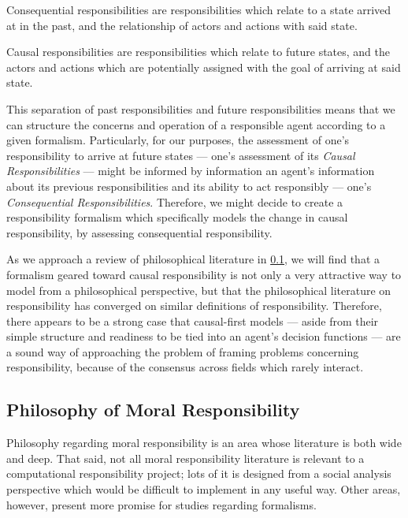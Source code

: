 \begin{displayquote}
    Consequential responsibilities are responsibilities which relate to a state arrived at in the past, and the relationship of actors and actions with said state.
\end{displayquote}\par

\begin{displayquote}
    Causal responsibilities are responsibilities which relate to future states, and the actors and actions which are potentially assigned with the goal of arriving at said state.
\end{displayquote}

This separation of past responsibilities and future responsibilities means that we can structure the concerns and operation of a responsible agent according to a given formalism. Particularly, for our purposes, the assessment of one's responsibility to arrive at future states --- one's assessment of its \emph{Causal Responsibilities} --- might be informed by information an agent's information about its previous responsibilities and its ability to act responsibly --- one's \emph{Consequential Responsibilities}. Therefore, we might decide to create a responsibility formalism which specifically models the change in causal responsibility, by assessing consequential responsibility.\par

As we approach a review of philosophical literature in \cref{subsec:philosophy}, we will find that a formalism geared toward causal responsibility is not only a very attractive way to model from a philosophical perspective, but that the philosophical literature on responsibility has converged on similar definitions of responsibility. Therefore, there appears to be a strong case that causal-first models --- aside from their simple structure and readiness to be tied into an agent's decision functions --- are a sound way of approaching the problem of framing problems concerning responsibility,  because of the consensus across fields which rarely interact.

\subsection{Philosophy of Moral Responsibility}\label{subsec:philosophy}
Philosophy regarding moral responsibility is an area whose literature is both wide and deep. That said, not all moral responsibility literature is relevant to a computational responsibility project; lots of it is designed from a social analysis perspective which would be difficult to implement in any useful way. Other areas, however, present more promise for studies regarding formalisms.\par

